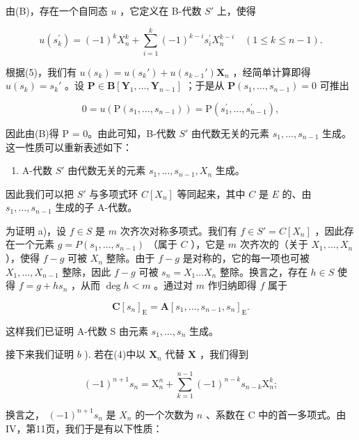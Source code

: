 由(B)，存在一个自同态 \(u\) ，它定义在 B-代数 \(S'\) 上，使得

\[
u \left(s _ {k} ^ {\prime}\right) = (- 1) ^ {k} X _ {n} ^ {k} + \sum_ {i = 1} ^ {k} (- 1) ^ {k - i} s _ {i} ^ {\prime} X _ {n} ^ {k - i} \quad (1 \leqslant k \leqslant n - 1).\tag{7}
\]

根据(5)，我们有 \(u(s_k) = u(s_k') + u(s_{k-1}') \mathbf{X}_n\) ，经简单计算即得 \(u(s_k) = s_k'\) 。设 \(\mathbf{P} \in \mathbf{B}[\mathbf{Y}_1, \ldots, \mathbf{Y}_{n-1}]\) ；于是从 \(\mathbf{P}(s_1, \ldots, s_{n-1}) = 0\) 可推出

\[
0 = u \left(\mathrm{P} \left(s _ {1}, \dots , s _ {n - 1}\right)\right) = \mathrm{P} \left(s _ {1} ^ {\prime}, \dots , s _ {n - 1} ^ {\prime}\right),
\]

因此由(B)得 P = 0。由此可知，B-代数 \(S'\) 由代数无关的元素 \(s_{1}, \ldots, s_{n-1}\) 生成。这一性质可以重新表述如下：

\begin{enumerate}
\def\labelenumi{(\Alph{enumi})}
\setcounter{enumi}{3}
\tightlist
\item
  A-代数 \(S'\) 由代数无关的元素 \(s_1, \ldots, s_{n-1}, X_n\) 生成。
\end{enumerate}

因此我们可以把 \(S'\) 与多项式环 \(C[X_n]\) 等同起来，其中 \(C\) 是 \(E\) 的、由 \(s_1, \ldots, s_{n-1}\) 生成的子 A-代数。

为证明 a)，设 \(f \in S\) 是 \(m\) 次齐次对称多项式。我们有 \(f \in S' = C[X_n]\) ，因此存在一个元素 \(g = P(s_1, \ldots, s_{n-1})\) （属于 \(C\) ），它是 \(m\) 次齐次的（关于 \(X_1, \ldots, X_n\) ），使得 \(f - g\) 可被 \(X_n\) 整除。由于 \(f - g\) 是对称的，它的每一项也可被 \(X_1, \ldots, X_{n-1}\) 整除，因此 \(f - g\) 可被 \(s_n = X_1 \ldots X_n\) 整除。换言之，存在 \(h \in S\) 使得 \(f = g + hs_n\) ，从而 \(\deg h < m\) 。通过对 \(m\) 作归纳即得 \(f\) 属于

\[
\mathbf {C} \left[ s _ {n} \right] _ {\mathrm{E}} = \mathbf {A} \left[ s _ {1}, \dots , s _ {n - 1}, s _ {n} \right] _ {\mathrm{E}}.
\]

这样我们已证明 A-代数 S 由元素 \(s_{1}, \ldots, s_{n}\) 生成。

接下来我们证明 \(b\) ). 若在(4)中以 \(\mathbf{X}_n\) 代替 \(\mathbf{X}\) ，我们得到

\[
(- 1) ^ {n + 1} s _ {n} = \mathrm{X} _ {n} ^ {n} + \sum_ {k = 1} ^ {n - 1} (- 1) ^ {n - k} s _ {n - k} \mathrm{X} _ {n} ^ {k};
\]

换言之， \((-1)^{n + 1}s_n\) 是 \(X_{n}\) 的一个次数为 \(n\) 、系数在 C 中的首一多项式。由IV，第11页，我们于是有以下性质：

